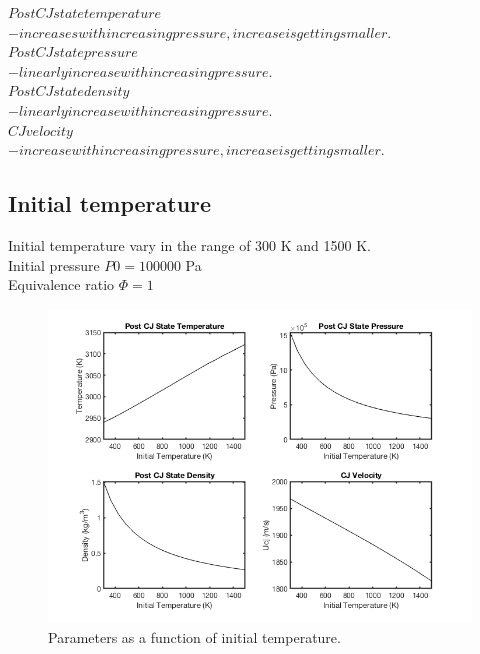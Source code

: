 \documentclass[a4paper]{article}
\newcommand{\sepspace}{\vspace*{1em}}
\begin{document}
\sepspace

\noindent
\circ $ Post CJ state temperature$\\ 
\indent $- increases with increasing pressure, increase is getting smaller.$\\
\circ $ Post CJ state pressure$\\
\indent $-linearly increase with increasing pressure.$\\
\circ $ Post CJ state density$\\
\indent $- linearly increase with increasing pressure.$\\
\circ $ CJ velocity$\\
\indent $- increase with increasing pressure, increase is getting smaller.$\\



\pagebreak

\subsection{Initial temperature}
\sepspace


Initial temperature vary in the range of 300 K and 1500 K.\\
Initial pressure $P0 = 100 000$ Pa\\
Equivalence ratio $\Phi = 1$

\begin{figure}[h!]
\centering
\includegraphics[width=1\textwidth]{T.png}
\caption{\label{fig:1}Parameters as a function of initial temperature.}
\end{figure}
\end{document}
